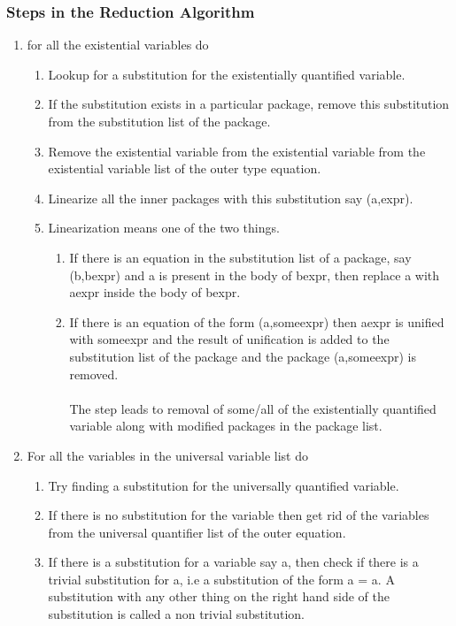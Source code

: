 \documentclass[11pt]{article}
\begin{document}
\subsubsection {Steps in the Reduction Algorithm}
\begin{enumerate}
    \item for all the existential variables do 
    \begin{enumerate}
    \setlength\itemsep {1em}
        \item Lookup for a substitution for the existentially quantified variable.
        \item If the substitution exists in a particular package, remove this substitution from the substitution list of the package.
        \item Remove the existential variable from the existential variable from the existential variable list of the outer type equation.
        \item Linearize all the inner packages with this substitution say (a,expr).
        \item Linearization means one of the two things.
        \begin{enumerate}
            \item If there is an equation in the substitution list of a package, say (b,bexpr) and a is present in the body of bexpr, then replace a with aexpr inside the body of bexpr. 
            \item If there is an equation of the form (a,someexpr) then aexpr is unified with someexpr and the result of unification is added to the substitution list of the package and the package (a,someexpr) is removed.
            ~~\\~~\\
            The step leads to removal of some/all of the existentially quantified variable along with modified packages in the package list.
        \end{enumerate}
    \end{enumerate}

    \item For all the variables in the universal variable list do 
        \begin{enumerate}
            \setlength\itemsep {1em}
            \item Try finding a substitution for the universally quantified variable.
            \item If there is no substitution for the variable then get rid of the variables from the universal quantifier list of the outer equation.
            \item If there is a substitution for a variable say a, then check if there is a trivial substitution for a, i.e a substitution of the form a = a. A substitution with any other thing on the right hand
            side of the substitution is called a non trivial substitution.
            

\end{enumerate}
\end{enumerate}
\end{document}

